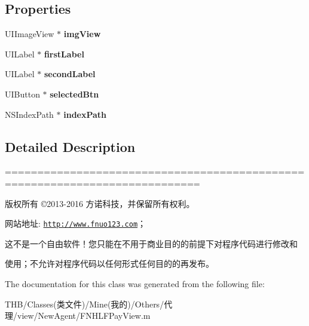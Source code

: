 \subsection*{Properties}
\begin{DoxyCompactItemize}
\item 
\mbox{\label{interface_f_n_h_l_f_pay_view_cell_a977a0699630c7c261a058f0adb1e3b9a}} 
U\+I\+Image\+View $\ast$ {\bfseries img\+View}
\item 
\mbox{\label{interface_f_n_h_l_f_pay_view_cell_ab24b286cc38a6ec62fceccb7d2de401e}} 
U\+I\+Label $\ast$ {\bfseries first\+Label}
\item 
\mbox{\label{interface_f_n_h_l_f_pay_view_cell_a07a5f5d802556c4cc1b4573269a87574}} 
U\+I\+Label $\ast$ {\bfseries second\+Label}
\item 
\mbox{\label{interface_f_n_h_l_f_pay_view_cell_a0edcabb81df289a1e4aca6ff099f7913}} 
U\+I\+Button $\ast$ {\bfseries selected\+Btn}
\item 
\mbox{\label{interface_f_n_h_l_f_pay_view_cell_a9789ed5bf46d5c5c998c391ae72fcee0}} 
N\+S\+Index\+Path $\ast$ {\bfseries index\+Path}
\end{DoxyCompactItemize}


\subsection{Detailed Description}
============================================================================

版权所有 ©2013-\/2016 方诺科技，并保留所有权利。

网站地址\+: \href{http://www.fnuo123.com}{\tt http\+://www.\+fnuo123.\+com}； 



这不是一个自由软件！您只能在不用于商业目的的前提下对程序代码进行修改和

使用；不允许对程序代码以任何形式任何目的的再发布。 

 

The documentation for this class was generated from the following file\+:\begin{DoxyCompactItemize}
\item 
T\+H\+B/\+Classes(类文件)/\+Mine(我的)/\+Others/代理/view/\+New\+Agent/F\+N\+H\+L\+F\+Pay\+View.\+m\end{DoxyCompactItemize}
